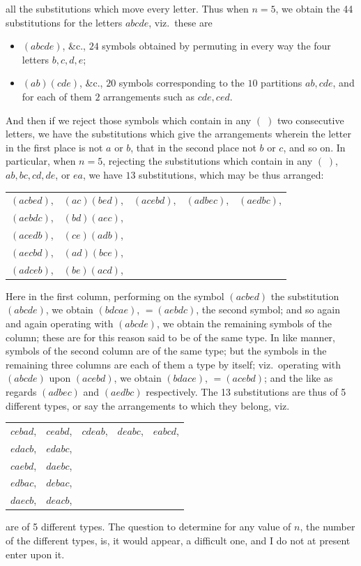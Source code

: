 \documentclass[11pt,a4paper]{article}
\begin{document}
\newpage


\noindent all the substitutions which move every letter. Thus when $n = 5$, we obtain the 44 substitutions for the letters $abcde$, viz.\ these are
\begin{itemize}[leftmargin=2em]
\item[] $(abcde)$, \&c., $24$ symbols obtained by permuting in every way the four letters $b, c, d, e$;
\item[] $(ab)(cde)$, \&c., $20$ symbols corresponding to the $10$ partitions $ab, cde$, and for each of them $2$ arrangements such as $cde, ced$.
\end{itemize}

And then if we reject those symbols which contain in any $(\;)$ two consecutive letters, we have the substitutions which give the arrangements wherein the letter in the first place is not $a$ or $b$, that in the second place not $b$ or $c$, and so on. In particular, when $n = 5$, rejecting the substitutions which contain in any $(\;)$, $ab, bc, cd, de$, or $ea$, we have $13$ substitutions, which may be thus arranged:
\begin{center}
\begin{tabular}{lllll}
$(acbed)$, & $(ac)(bed)$, & $(acebd)$, & $(adbec)$, & $(aedbc)$,\\
$(aebdc)$, & $(bd)(aec)$, & & & \\
$(acedb)$, & $(ce)(adb)$, & & & \\
$(aecbd)$, & $(ad)(bce)$, & & & \\
$(adceb)$, & $(be)(acd)$, & & &
\end{tabular}
\end{center}

Here in the first column, performing on the symbol $(acbed)$ the substitution $(abcde)$, we obtain $(bdcae)$, $=(aebdc)$, the second symbol; and so again and again operating with $(abcde)$, we obtain the remaining symbols of the column; these are for this reason said to be of the same type. In like manner, symbols of the second column are of the same type; but the symbols in the remaining three columns are each of them a type by itself; viz.\ operating with $(abcde)$ upon $(acebd)$, we obtain $(bdace)$, $= (acebd)$; and the like as regards $(adbec)$ and $(aedbc)$ respectively. The 13 substitutions are thus of 5 different types, or say the arrangements to which they belong, viz.
\begin{center}
\begin{tabular}{lllll}
$cebad$, & $ceabd$, & $cdeab$, & $deabc$, & $eabcd$,\\
$edacb$, & $edabc$, & & &\\
$caebd$, & $daebc$, & & &\\
$edbac$, & $debac$, & & &\\
$daecb$, & $deacb$, & & &
\end{tabular}
\end{center}
are of 5 different types. The question to determine for any value of $n$, the number of the different types, is, it would appear, a difficult one, and I do not at present enter upon it.
\end{document}

